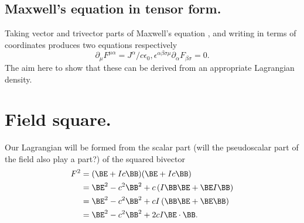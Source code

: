 
\subsection{Maxwell's equation in tensor form.}
%
Taking vector and trivector parts of Maxwell's equation , and writing in terms of coordinates produces two equations respectively
%
\begin{subequations}
\label{eqn:lagrangianFieldDensity:111}
\begin{equation}\label{eqn:maxFieldLag:vectorPartOfMaxwells}
\partial_{\mu} F^{\mu\alpha} = J^{\alpha}/c \epsilon_0,
\end{equation}
\begin{equation}\label{eqn:maxFieldLag:dualPartOfMaxwells}
\epsilon^{ \alpha \beta \sigma \mu } \partial_{\alpha} F_{\beta\sigma} = 0.
\end{equation}
\end{subequations}
%
The aim here to show that these can be derived from an appropriate Lagrangian density.
%
\section{Field square.}
%
Our Lagrangian will be formed from the scalar part (will the pseudoscalar part of the field also play a part?) of the squared bivector
%
\begin{equation}\label{eqn:lagrangianFieldDensity:80}
\begin{aligned}
F^2
&= (\BE + I c \BB) (\BE + I c \BB) \\
&= \BE^2 - c^2 \BB^2 + c \left( I \BB \BE + \BE I \BB \right) \\
&= \BE^2 - c^2 \BB^2 + c I \left( \BB \BE + \BE \BB \right) \\
&= \BE^2 - c^2 \BB^2 + 2 c I \BE \cdot \BB.
\end{aligned}
\end{equation}
%
